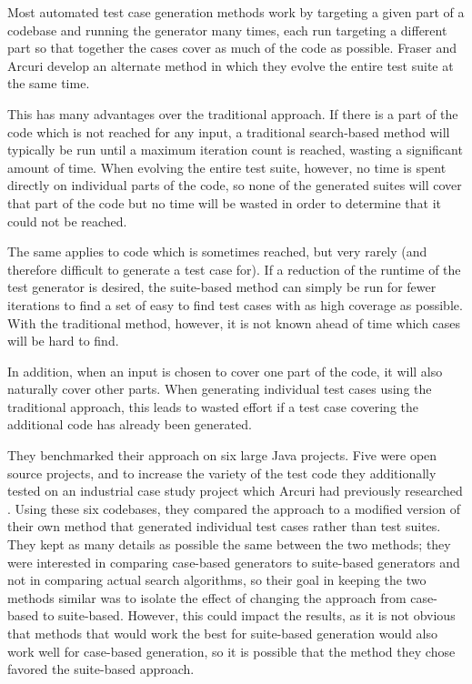 \documentclass{sig-alternate-05-2015}
\begin{document}
Most automated test case generation methods work by targeting a given part of
a codebase and running the generator many times, each run targeting a different 
part so that together the cases cover as much of the code as possible. Fraser
and Arcuri \cite{fraser-arcuri} develop an alternate method in which they
evolve the entire test suite at the same time.

This has many advantages over the traditional approach. If there is a part of
the code which is not reached for any input, a traditional search-based method
will typically be run until a maximum iteration count is reached, wasting a
significant amount of time. When evolving the entire test suite, however, no
time is spent directly on individual parts of the code, so none of the
generated suites will cover that part of the code but no time will be wasted in
order to determine that it could not be reached.

The same applies to code which is sometimes reached, but very rarely (and
therefore difficult to generate a test case for). If a reduction of the runtime
of the test generator is desired, the suite-based method can simply be run for
fewer iterations to find a set of easy to find test cases with as high coverage
as possible. With the traditional method, however, it is not known ahead of
time which cases will be hard to find.

In addition, when an input is chosen to cover one part of the code, it will
also naturally cover other parts. When generating individual test cases using
the traditional approach, this leads to wasted effort if a test case covering
the additional code has already been generated.

They benchmarked their approach on six large Java projects. Five were open
source projects, and to increase the variety of the test code they additionally
tested on an industrial case study project which Arcuri had previously
researched \cite{arcuri}. Using these six codebases, they compared the approach
to a modified
version of their own method that generated individual test
cases rather than test suites. They kept as many details as possible the same
between the two methods; they were interested in comparing case-based
generators to suite-based generators and not in comparing actual search
algorithms, so their goal in keeping the two methods similar was to isolate
the effect of changing the approach from case-based to suite-based. However,
this could impact the results, as it is not obvious that methods that would
work the best for suite-based generation would also work well for case-based
generation, so it is possible that the method they chose favored the
suite-based approach.
\end{document}

